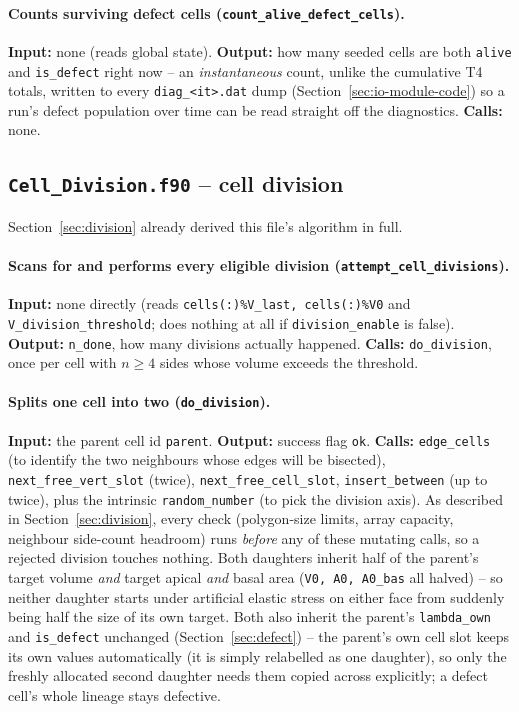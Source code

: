 \documentclass[11pt,a4paper]{report}
\begin{document}
\paragraph{Counts surviving defect cells
(\texttt{count\_alive\_defect\_cells}).} \textbf{Input:} none (reads
global state). \textbf{Output:} how many seeded cells are both
\texttt{alive} and \texttt{is\_defect} right now -- an
\emph{instantaneous} count, unlike the cumulative T4 totals, written to
every \texttt{diag\_<it>.dat} dump (Section~\ref{sec:io-module-code}) so
a run's defect population over time can be read straight off the
diagnostics. \textbf{Calls:} none.

\subsection{\texttt{Cell\_Division.f90} -- cell division}
Section~\ref{sec:division} already derived this file's algorithm in
full.
\paragraph{Scans for and performs every eligible division
(\texttt{attempt\_cell\_divisions}).} \textbf{Input:} none directly
(reads \texttt{cells(:)\%V\_last, cells(:)\%V0} and
\texttt{V\_division\_threshold}; does nothing at all if
\texttt{division\_enable} is false). \textbf{Output:} \texttt{n\_done},
how many divisions actually happened. \textbf{Calls:}
\texttt{do\_division}, once per cell with $n\ge4$ sides whose volume
exceeds the threshold.
\paragraph{Splits one cell into two (\texttt{do\_division}).}
\textbf{Input:} the parent cell id \texttt{parent}. \textbf{Output:}
success flag \texttt{ok}. \textbf{Calls:} \texttt{edge\_cells} (to
identify the two neighbours whose edges will be bisected),
\texttt{next\_free\_vert\_slot} (twice), \texttt{next\_free\_cell\_slot},
\texttt{insert\_between} (up to twice), plus the intrinsic
\texttt{random\_number} (to pick the division axis). As described in
Section~\ref{sec:division}, every check (polygon-size limits, array
capacity, neighbour side-count headroom) runs \emph{before} any of
these mutating calls, so a rejected division touches nothing. Both
daughters inherit half of the parent's target volume \emph{and} target
apical \emph{and} basal area (\texttt{V0, A0, A0\_bas} all
halved) -- so neither daughter starts under artificial elastic stress
on either face from suddenly being half the size of its own target.
Both also inherit the parent's \texttt{lambda\_own} and
\texttt{is\_defect} unchanged (Section~\ref{sec:defect}) -- the parent's
own cell slot keeps its own values automatically (it is simply
relabelled as one daughter), so only the freshly allocated second
daughter needs them copied across explicitly; a defect cell's whole
lineage stays defective.
\end{document}
